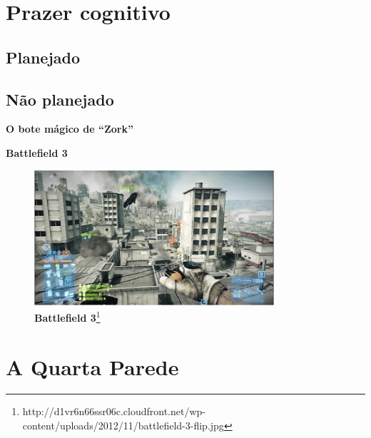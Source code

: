 \expandafter\documentclass\expandafter[table, usenames, svgnames, dvipsnames, \classopts]{beamer}
\begin{document}
\section{Prazer cognitivo}

\subsection{Planejado}
\subsection{Não planejado}

\begin{frame}{\textbf{O bote mágico de ``Zork''}}


\end{frame}

\begin{frame}{\textbf{Battlefield 3}}
    \centering
    \begin{figure}
        \includegraphics[height=5cm]{tank}
        \caption{\scriptsize\textbf{Battlefield 3}\footnote{http://d1vr6n66ssr06c.cloudfront.net/wp-content/uploads/2012/11/battlefield-3-flip.jpg}}
    \end{figure}
\end{frame}

\section{A Quarta Parede}
\end{document}
